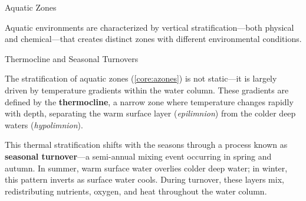 \documentclass[10pt]{article}
\begin{document}
    \begin{core}[label=core:azones]{Aquatic Zones}

      Aquatic environments are characterized by vertical stratification---both physical and chemical---that creates distinct zones with different environmental conditions.


      \begin{enumerate}


      \end{enumerate}

    \end{core}

    \begin{core}{Thermocline and Seasonal Turnovers}

      The stratification of aquatic zones (\autoref{core:azones}) is not static---it is largely driven by temperature gradients within the water column. These gradients are defined by the \textbf{thermocline}, a narrow zone where temperature changes rapidly with depth, separating the warm surface layer (\textit{epilimnion}) from the colder deep waters (\textit{hypolimnion}).


      This thermal stratification shifts with the seasons through a process known as \textbf{seasonal turnover}---a semi-annual mixing event occurring in spring and autumn. In summer, warm surface water overlies colder deep water; in winter, this pattern inverts as surface water cools. During turnover, these layers mix, redistributing nutrients, oxygen, and heat throughout the water column.

    \end{core}
\end{document}
